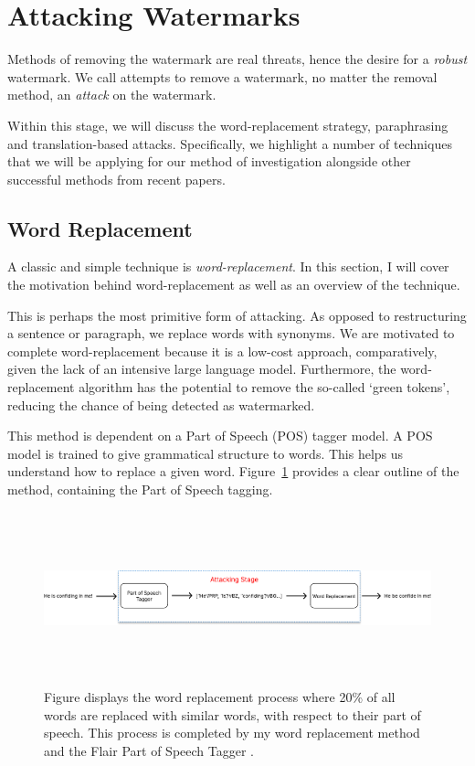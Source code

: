 \documentclass{l4proj}
\theoremstyle{definition}
\begin{document}
\section{Attacking Watermarks}
        Methods of removing the watermark are real threats, hence the desire for a \emph{robust} watermark. We call attempts to remove a watermark, no matter the removal method, an \emph{attack} on the watermark.

        Within this stage, we will discuss the word-replacement strategy, paraphrasing and translation-based attacks. Specifically, we highlight a number of techniques that we will be applying for our method of investigation alongside other successful methods from recent papers.

    \subsection{Word Replacement}
        A classic and simple technique is \emph{word-replacement}. In this section, I will cover the motivation behind word-replacement as well as an overview of the technique.

        This is perhaps the most primitive form of attacking. As opposed to restructuring a sentence or paragraph, we replace words with synonyms. We are motivated to complete word-replacement because it is a low-cost approach, comparatively, given the lack of an intensive large language model. Furthermore, the word-replacement algorithm has the potential to remove the so-called `green tokens', reducing the chance of being detected as watermarked.  

        This method is dependent on a Part of Speech (POS) tagger model. A POS model is trained to give grammatical structure to words. This helps us understand how to replace a given word. Figure~\ref{fig:word-replacement-process} provides a clear outline of the method, containing the Part of Speech tagging. 

        \begin{figure}[ht]
            \centering
            \includegraphics[height=5cm, width=1\linewidth, keepaspectratio]{images/background/word-replacement-process.pdf}
            \caption{Figure displays the word replacement process where 20\% of all words are replaced with similar words, with respect to their part of speech. This process is completed by my word replacement method and the Flair Part of Speech Tagger \citep{akbik2018coling}.}
            \label{fig:word-replacement-process}
        \end{figure}
        
\end{document}

